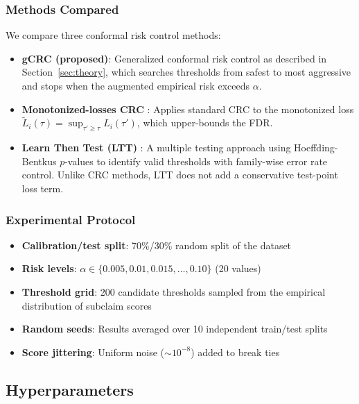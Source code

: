 \subsubsection{Methods Compared}

We compare three conformal risk control methods:
\begin{itemize}
    \item \textbf{gCRC (proposed)}: Generalized conformal risk control as described in Section~\ref{sec:theory}, which searches thresholds from safest to most aggressive and stops when the augmented empirical risk exceeds $\alpha$.

    \item \textbf{Monotonized-losses CRC} \citep{angelopoulos2022conformal, mohri2024language}: Applies standard CRC to the monotonized loss $\tilde{L}_i(\tau) = \sup_{\tau' \geq \tau} L_i(\tau')$, which upper-bounds the FDR.

    \item \textbf{Learn Then Test (LTT)} \citep{angelopoulos2021learn}: A multiple testing approach using Hoeffding-Bentkus $p$-values to identify valid thresholds with family-wise error rate control. Unlike CRC methods, LTT does not add a conservative test-point loss term.
\end{itemize}

\subsubsection{Experimental Protocol}

\begin{itemize}
    \item \textbf{Calibration/test split}: 70\%/30\% random split of the dataset
    \item \textbf{Risk levels}: $\alpha \in \{0.005, 0.01, 0.015, \ldots, 0.10\}$ (20 values)
    \item \textbf{Threshold grid}: 200 candidate thresholds sampled from the empirical distribution of subclaim scores
    \item \textbf{Random seeds}: Results averaged over 10 independent train/test splits
    \item \textbf{Score jittering}: Uniform noise ($\sim 10^{-8}$) added to break ties
\end{itemize}

\subsection{Hyperparameters}
\label{subsec:medqa_hyperparams}

